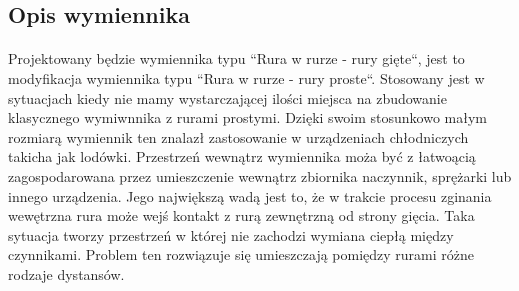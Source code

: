 \subsection{Opis wymiennika}

\paragraph{}{
    Projektowany będzie wymiennika typu ``Rura w rurze - rury gięte``, jest to modyfikacja wymiennika typu ``Rura w rurze - rury proste``. 
    Stosowany jest w sytuacjach kiedy nie mamy wystarczającej ilości miejsca na zbudowanie klasycznego wymiwnnika z rurami prostymi. Dzięki swoim stosunkowo małym rozmiarą wymiennik ten znalazł zastosowanie w urządzeniach chłodniczych takicha jak lodówki. 
    Przestrzeń wewnątrz wymiennika moża być z łatwoącią zagospodarowana przez umieszczenie wewnątrz zbiornika naczynnik, sprężarki lub innego urządzenia.
    Jego największą wadą jest to, że w trakcie procesu zginania wewętrzna rura może wejś kontakt z rurą zewnętrzną od strony gięcia.
    Taka sytuacja  tworzy przestrzeń w której nie zachodzi wymiana ciepłą między czynnikami.
    Problem ten rozwiązuje się umieszczają pomiędzy rurami różne rodzaje dystansów.
}